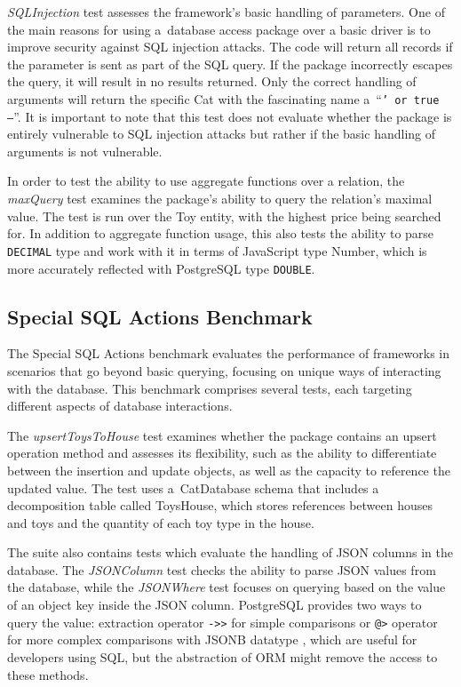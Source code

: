 \textit{SQLInjection} test assesses the framework's basic handling of
parameters. One of the main reasons for using a~database access package over a
basic driver is to improve security against SQL injection attacks. The code will
return all records if the parameter is sent as part of the SQL query. If the
package incorrectly escapes the query, it will result in no results returned.
Only the correct handling of arguments will return the specific Cat with the
fascinating name a~\enquote{\texttt{' or true --}}. It is important to note that
this test does not evaluate whether the package is entirely vulnerable to SQL
injection attacks but rather if the basic handling of arguments is not
vulnerable.

In order to test the ability to use aggregate functions over a relation, the
\textit{maxQuery} test examines the package's ability to query the relation's
maximal value. The test is run over the Toy entity, with the highest price being
searched for. In addition to aggregate function usage, this also tests the
ability to parse \texttt{DECIMAL} type and work with it in terms of JavaScript
type Number, which is more accurately reflected with PostgreSQL type
\texttt{DOUBLE}.

\subsection*{Special SQL Actions Benchmark}

The Special SQL Actions benchmark evaluates the performance of frameworks in
scenarios that go beyond basic querying, focusing on unique ways of interacting
with the database. This benchmark comprises several tests, each targeting
different aspects of database interactions.

The \textit{upsertToysToHouse} test examines whether the package contains an
upsert operation method and assesses its flexibility, such as the ability to
differentiate between the insertion and update objects, as well as the capacity
to reference the updated value. The test uses a~CatDatabase schema that includes
a decomposition table called ToysHouse, which stores references between houses
and toys and the quantity of each toy type in the house.

The suite also contains tests which evaluate the handling of JSON columns in the
database. The \textit{JSONColumn} test checks the ability to parse JSON values
from the database, while the \textit{JSONWhere} test focuses on querying based
on the value of an object key inside the JSON column. PostgreSQL provides two
ways to query the value: extraction operator \texttt{->>} for simple comparisons
or \texttt{@>} operator for more complex comparisons with JSONB datatype
\cite{postgres-json}, which are useful for developers using SQL, but the
abstraction of ORM might remove the access to these methods.


